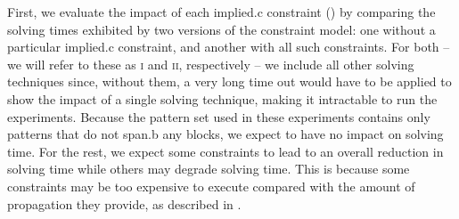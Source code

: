 \newsavebox{\solvTechPlot}
\newlength{\solvTechPlotW}
\newlength{\solvTechSubfigW}


\def\modelA{\textsc{i}}
\def\modelB{\textsc{ii}}

First, we evaluate the impact of each \gls{implied.c} \gls{constraint}
() by comparing the solving times exhibited by two versions of the
\gls{constraint model}: one without a particular \gls{implied.c}
\gls{constraint}, and another with all such \glspl{constraint}.
%
For both  -- we will refer to these as \modelA{}
and \modelB, respectively -- we include all other solving techniques since,
without them, a very long time out would have to be applied to show the impact
of a single solving technique, making it intractable to run the experiments.
%
Because the \gls{pattern set} used in these experiments contains only
\glspl{pattern} that do not \gls{span.b} any \glspl{block}, we expect
 to
have no impact on solving time.
%
For the rest, we expect some \glspl{constraint} to lead to an overall reduction
in solving time while others may degrade solving time.
%
This is because some \glspl{constraint} may be too expensive to execute compared
with the amount of \gls{propagation} they provide, as described in
.

